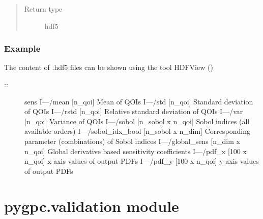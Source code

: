 \documentclass[letterpaper,10pt,english,openany,oneside]{sphinxmanual}
\begin{document}
\begin{fulllineitems}
\begin{quote}
\begin{description}
\item[{Return type}] \leavevmode
hdf5

\end{description}\end{quote}
\subsubsection*{Example}

The content of .hdf5 files can be shown using the tool HDFView
()
\begin{description}
\item[{::}] \leavevmode
sens
I—/mean               {[}n\_qoi{]}                 Mean of QOIs
I—/std                {[}n\_qoi{]}                 Standard deviation of QOIs
I—/rstd               {[}n\_qoi{]}                 Relative standard deviation of QOIs
I—/var                {[}n\_qoi{]}                 Variance of QOIs
I—/sobol              {[}n\_sobol x n\_qoi{]}       Sobol indices (all available orders)
I—/sobol\_idx\_bool     {[}n\_sobol x n\_dim{]}       Corresponding parameter (combinations) of Sobol indices
I—/global\_sens        {[}n\_dim x n\_qoi{]}         Global derivative based sensitivity coefficients
I—/pdf\_x              {[}100 x n\_qoi{]}           x-axis values of output PDFs
I—/pdf\_y              {[}100 x n\_qoi{]}           y-axis values of output PDFs

\end{description}

\end{fulllineitems}



\section{pygpc.validation module}
\label{\detokenize{pygpc:module-pygpc.validation}}\label{\detokenize{pygpc:pygpc-validation-module}}
\end{document}
